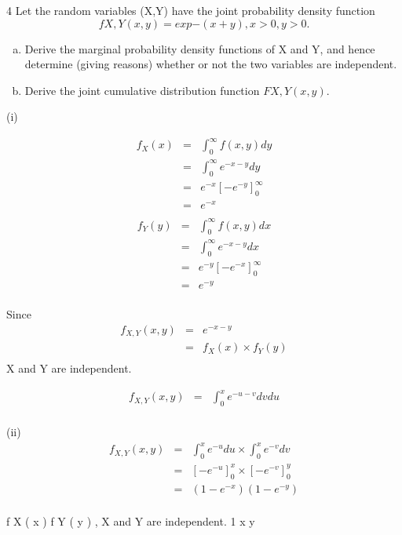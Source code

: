 \documentclass[a4paper,12pt]{article}
\begin{document}
4
Let the random variables (X,Y) have the joint probability density function
\[f X , Y ( x , y ) = exp{ − ( x + y )}, x > 0, y > 0.\]
\begin{enumerate}[(a)]
\item Derive the marginal probability density functions of X and Y, and hence determine (giving reasons) whether or not the two variables are independent.
\item Derive the joint cumulative distribution function $F X , Y ( x , y )$.
\end{enumerate}


(i)

\begin{eqnarray*}
f_{X} ( x )  &=& \int^{\infty}_{0}f ( x , y ) dy\\
&=& \int^{\infty}_{0}e^{-x-y} dy\\
&=& e^{-x} \left[ -e^{-y} \right]^{\infty}_{0}\\
&=& e^{-x}\\
\end{eqnarray*}
\begin{eqnarray*}
f_{Y} ( y )
&=& \int^{\infty}_{0}f ( x , y ) dx\\
&=& \int^{\infty}_{0}e^{-x-y} dx\\
&=& e^{-y} \left[ -e^{-x} \right]^{\infty}_{0}\\
&=& e^{-y}\\
\end{eqnarray*}


Since 
\begin{eqnarray*}
f_{X , Y} ( x , y ) &=& e^{-x-y} \\
 &=&  f_{X} ( x ) \times f_{Y} ( y )\\
\end{eqnarray*}
X and Y are independent.


\begin{eqnarray*}
f_{X , Y} ( x , y )
&=& \int^{x}_{0}e^{-u-v} dv du\\
\end{eqnarray*}

(ii)
\begin{eqnarray*}
f_{X , Y} ( x , y )
&=& \int^{x}_{0}e^{-u} du\times \int^{x}_{0}e^{-v} dv \\
&=& \left[ -e^{-u} \right]^{x}_{0} \times \left[ -e^{-v} \right]^{y}_{0} \\
&=& ( 1 -e^{-x} ) ( 1 -e^{-y} )\\
\end{eqnarray*}

f X ( x ) f Y ( y ) , X and Y are independent.
1
x y
\end{document}

